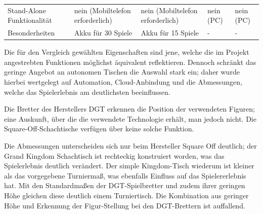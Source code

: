 \begin{longtable}[]{@{}lllll@{}}
\begin{minipage}[t]{0.19\columnwidth}\raggedright
Stand-Alone Funktionalität\strut
\end{minipage} & \begin{minipage}[t]{0.19\columnwidth}\raggedright
nein (Mobiltelefon erforderlich)\strut
\end{minipage} & \begin{minipage}[t]{0.20\columnwidth}\raggedright
nein (Mobiltelefon erforderlich)\strut
\end{minipage} & \begin{minipage}[t]{0.15\columnwidth}\raggedright
nein (PC)\strut
\end{minipage} & \begin{minipage}[t]{0.13\columnwidth}\raggedright
nein (PC)\strut
\end{minipage}\tabularnewline
\begin{minipage}[t]{0.19\columnwidth}\raggedright
Besonderheiten\strut
\end{minipage} & \begin{minipage}[t]{0.19\columnwidth}\raggedright
Akku für 30 Spiele\strut
\end{minipage} & \begin{minipage}[t]{0.20\columnwidth}\raggedright
Akku für 15 Spiele\strut
\end{minipage} & \begin{minipage}[t]{0.15\columnwidth}\raggedright
-\strut
\end{minipage} & \begin{minipage}[t]{0.13\columnwidth}\raggedright
-\strut
\end{minipage}\tabularnewline
\bottomrule
\end{longtable}

Die für den Vergleich gewählten Eigenschaften sind jene, welche die im
Projekt angestrebten Funktionen möglichst äquivalent reflektieren.
Dennoch schränkt das geringe Angebot an autonomen Tischen die Auswahl
stark ein; daher wurde hierbei wertgelegt auf Automation,
Cloud-Anbindung und die Abmessungen, welche das Spielerlebnis am
deutlichsten beeinflussen.

Die Bretter des Herstellers DGT erkennen die Position der verwendeten
Figuren; eine Auskunft, über die die verwendete Technologie erhält, man
jedoch nicht. Die Square-Off-Schachtische verfügen über keine solche
Funktion.

Die Abmessungen unterscheiden sich nur beim Hersteller Square Off
deutlich; der Grand Kingdom Schachtisch ist rechteckig konstruiert
worden, was das Spielerlebnis deutlich verändert. Der simple
Kingdom-Tisch wiederum ist kleiner als das vorgegebene Turniermaß, was
ebenfalls Einfluss auf das Spielererlebnis hat. Mit den Standardmaßen
der DGT-Spielbretter und zudem ihrer geringen Höhe gleichen diese
deutlich einem Turniertisch. Die Kombination aus geringer Höhe und
Erkennung der Figur-Stellung bei den DGT-Brettern ist auffallend.

